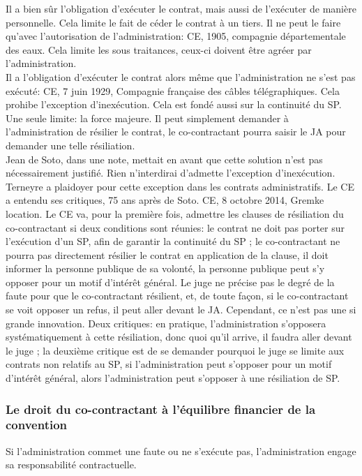 \documentclass[10pt, a4paper, openany]{book}
\begin{document}
Il a bien sûr l'obligation d'exécuter le contrat, mais aussi de l'exécuter de manière personnelle. Cela limite le fait de céder le contrat à un tiers. Il ne peut le faire qu'avec l'autorisation de l'administration: CE, 1905, compagnie départementale des eaux. Cela limite les sous traitances, ceux-ci doivent être agréer par l'administration. \\
Il a l'obligation d'exécuter le contrat alors même que l'administration ne s'est pas exécuté: CE, 7 juin 1929, Compagnie française des câbles télégraphiques. Cela prohibe l'exception d'inexécution. Cela est fondé aussi sur la continuité du SP. Une seule limite: la force majeure. Il peut simplement demander à l'administration de résilier le contrat, le co-contractant pourra saisir le JA pour demander une telle résiliation. \\
Jean de Soto, dans une note, mettait en avant que cette solution n'est pas nécessairement justifié. Rien n'interdirai d'admette l'exception d'inexécution. \\
Terneyre a plaidoyer pour cette exception dans les contrats administratifs. Le CE a entendu ses critiques, 75 ans après de Soto. CE, 8 octobre 2014, Gremke location. Le CE va, pour la première fois, admettre les clauses de résiliation du co-contractant si deux conditions sont réunies: le contrat ne doit pas porter sur l'exécution d'un SP, afin de garantir la continuité du SP ; le co-contractant ne pourra pas directement résilier le contrat en application de la clause, il doit informer la personne publique de sa volonté, la personne publique peut s'y opposer pour un motif d'intérêt général. Le juge ne précise pas le degré de la faute pour que le co-contractant résilient, et, de toute façon, si le co-contractant se voit opposer un refus, il peut aller devant le JA. Cependant, ce n'est pas une si grande innovation. Deux critiques: en pratique, l'administration s'opposera systématiquement à cette résiliation, donc quoi qu'il arrive, il faudra aller devant le juge ; la deuxième critique est de se demander pourquoi le juge se limite aux contrats non relatifs au SP, si l'administration peut s'opposer pour un motif d'intérêt général, alors l'administration peut s'opposer à une résiliation de SP. 

\subsubsection{Le droit du co-contractant à l'équilibre financier de la convention}

Si l'administration commet une faute ou ne s'exécute pas, l'administration engage sa responsabilité contractuelle. 
\end{document}
